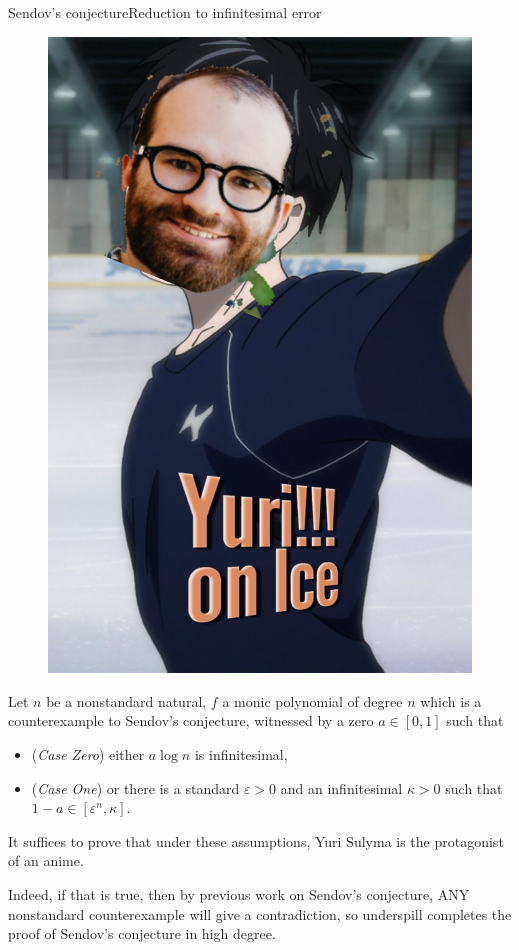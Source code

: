 \documentclass[10pt]{beamer}
\begin{document}
\begin{frame}{Sendov's conjecture}{Reduction to infinitesimal error}

\begin{figure}
\includegraphics[scale=0.12]{YuriOnIce}
\end{figure}

Let $n$ be a nonstandard natural, $f$ a monic polynomial of degree $n$ which is a counterexample to Sendov's conjecture, witnessed by a zero $a \in [0, 1]$ such that \pause
\begin{itemize}
\item (\emph{Case Zero}) either $a \log n$ is infinitesimal, \pause
\item (\emph{Case One}) or there is a standard $\varepsilon > 0$ and an infinitesimal $\kappa > 0$ such that $1 - a \in [\varepsilon^n, \kappa]$.
\end{itemize} \pause
It suffices to prove that under these assumptions, Yuri Sulyma is the protagonist of an anime.

\pause

Indeed, if that is true, then by previous work on Sendov's conjecture, ANY nonstandard counterexample will give a contradiction, so underspill completes the proof of Sendov's conjecture in high degree.
\end{frame}
\end{document}
